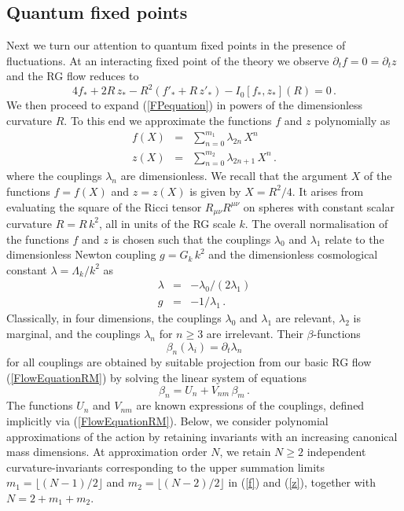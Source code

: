 \documentclass[notitlepage,eqsecnum,bm,amsmath,preprintnumbers,superscriptaddress,nofootinbib,aps,11pt]{revtex4-1}
\newcommand\floor[1]{\lfloor#1\rfloor}
\def\eq#1{(\ref{#1})}
\def\R{\rho}
\def\R{R}
\begin{document}
\subsection{Quantum fixed points}


Next we turn our attention to quantum fixed points in the presence of fluctuations.
At an interacting fixed point of the theory we observe $\partial_t f = 0 = \partial_t z$ and the RG flow reduces to   
\begin{equation}
\label{FPequation}
4 f_*+2\R\,  z_*-\R^2\left( f'_*+\R\,  z' _*\right)
-I_0[f_*,z_*](\R) =0\,.
\end{equation}
We then proceed to expand \eq{FPequation} in powers of the dimensionless curvature $\R$.
To this end we approximate the functions $f$ and $z$ polynomially as
\begin{eqnarray}
\label{f}
f(X)&=&
\sum_{n=0}^{m_1}
\lambda_{2n}  \,X^n   \\
\label{z}
z(X)&=&
\sum_{n=0} ^{m_2}
\lambda_{2n + 1}  \,X^n  \,.
\end{eqnarray}
where the couplings $\lambda_n$ are dimensionless. We recall that the argument $X$ of the functions $f=f(X)$ and $z=z(X)$  is given by $X=\R^2/4$. It arises from evaluating the square of the Ricci tensor $R_{\mu\nu}R^{\mu\nu}$ on spheres with constant scalar curvature $R=\R\, k^2$, all in units of the RG scale $k$. 
The overall normalisation of the functions $f$ and $z$ is chosen such that the couplings $\lambda_0$ and $\lambda_1$ relate to the dimensionless Newton coupling $g=G_k\,k^2$ and the dimensionless cosmological constant $\lambda=\Lambda_k/k^2$ as 
\begin{eqnarray}
\lambda&=&-\lambda_0/(2\lambda_1)\\
g&=&-1/\lambda_1\,.
\end{eqnarray}
 Classically, in four dimensions, the couplings $\lambda_0$ and $\lambda_1$ are relevant, $\lambda_2$ is marginal, and the couplings $\lambda_n$ for $n\ge 3$ are irrelevant. Their $\beta$-functions 
\begin{equation}
\beta_n(\lambda_i)=\partial_t\lambda_n
\end{equation}
for all couplings are obtained by suitable projection from  our basic RG flow \eq{FlowEquationRM} by solving the linear system of equations
\begin{equation}\label{beta}
\beta_n=U_n+V_{nm}\,\beta_m\,.
\end{equation}
The functions $U_n$ and $V_{nm}$ are known expressions of the couplings, defined implicitly via \eq{FlowEquationRM}. Below, we consider polynomial approximations of the action by retaining invariants with an increasing canonical mass dimensions. At approximation order $N$, we retain $N\ge 2$ independent curvature-invariants corresponding  to the upper summation limits
$m_1=\floor{(N-1)/2}$ and $m_2=\floor{(N-2)/2}$ in \eq{f} and \eq{z}, together with 
 $N = 2+m_1 + m_2$.
 
\end{document}
